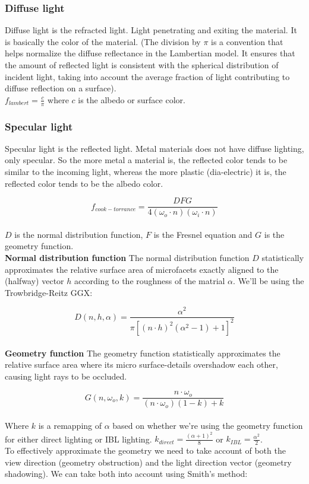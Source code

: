 \documentclass{article}
\begin{document}
\subsubsection{Diffuse light}
Diffuse light is the refracted light. Light penetrating and exiting the material. It is basically the color of the material. (The division by $\pi$  is a convention that helps normalize the diffuse reflectance in the Lambertian model. It ensures that the amount of reflected light is consistent with the spherical distribution of incident light, taking into account the average fraction of light contributing to diffuse reflection on a surface).\newline
\\
$f_{lambert} = \frac{c}{\pi}$ where $c$ is the albedo or surface color.

\subsubsection{Specular light}
Specular light is the reflected light. Metal materials does not have diffuse lighting, only specular. So the more metal a material is, the reflected color tends to be similar to the incoming light, whereas the more plastic (dia-electric) it is, the reflected color tends to be the albedo color.

$$f_{cook-torrance} = \frac{DFG}{4\left( \omega_{o} \cdot n \right)\left( \omega_{i} \cdot n \right)}$$
\\
$D$ is the normal distribution function, $F$ is the Fresnel equation and $G$ is the geometry function.\newline
\\
\textbf{Normal distribution function}\newline
The normal distribution function $D$ statistically approximates the relative surface area of microfacets exactly aligned to the (halfway) vector $h$ according to the roughness of the matrial $\alpha$. We'll be using the Trowbridge-Reitz GGX:

$$D(n,h,\alpha) = \frac{\alpha^{2}}{\pi \left[ \left( n \cdot h \right)^{2} \left( \alpha^{2} - 1\right) + 1\right]^{2}}$$
\\
\textbf{Geometry function}\newline
The geometry function statistically approximates the relative surface area where its micro surface-details overshadow each other, causing light rays to be occluded.

$$G(n,\omega_{o}, k) = \frac{n \cdot \omega_{o}}{\left( n \cdot \omega_{o}\right) \left( 1 - k\right) + k}$$
\\
Where $k$ is a remapping of $\alpha$ based on whether we're using the geometry function for either direct lighting or IBL lighting. $k_{direct} = \frac{\left( \alpha + 1\right)^{2}}{8}$ or $k_{IBL} = \frac{\alpha^{2}}{2}$. \newline
\\
To effectively approximate the geometry we need to take account of both the view direction (geometry obstruction) and the light direction vector (geometry shadowing). We can take both into account using Smith's method:
\end{document}
